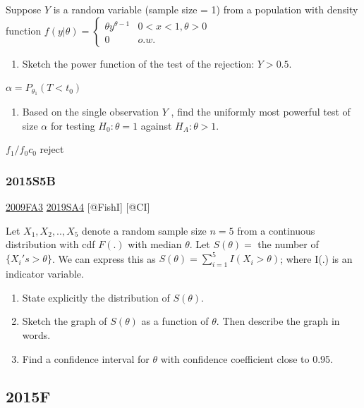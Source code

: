\documentclass[6pt,twocolumn,Portrait]{article}
\providecommand{\tightlist}{%
  \setlength{\itemsep}{0pt}\setlength{\parskip}{0pt}}
\begin{document}
Suppose \(Y\) is a random variable (sample size = 1) from a population
with density function
\(f(y|\theta)=\begin{cases}\theta y^{\theta-1}& 0<x<1,\theta>0\\0& o.w.\end{cases}\)

\begin{enumerate}
\def\labelenumi{(\alph{enumi})}
\tightlist
\item
  Sketch the power function of the test of the rejection: \(Y>0.5\).
\end{enumerate}

\(\alpha=P_{\theta_1}(T<t_0)\)

\begin{enumerate}
\def\labelenumi{(\alph{enumi})}
\setcounter{enumi}{1}
\tightlist
\item
  Based on the single observation \(Y\) , find the uniformly most
  powerful test of size \(\alpha\) for testing \(H_0:\theta=1\) against
  \(H_A :\theta>1\).
\end{enumerate}

\(f_1/f_0c_0\) reject

\hypertarget{s5b-1}{%
\subsubsection{2015S5B}\label{s5b-1}}

\protect\hyperlink{fa3}{2009FA3} \protect\hyperlink{sa4-3}{2019SA4}
{[}@FishI{]} {[}@CI{]}

Let \(X_1,X_2,..,X_{5}\) denote a random sample size \(n=5\) from a
continuous distribution with cdf \(F(.)\) with median \(\theta\). Let
\(S(\theta)=\) the number of \(\{X_i's>\theta\}\). We can express this
as \(S(\theta)=\sum_{i=1}^5I(X_i>\theta)\); where I(.) is an indicator
variable.

\begin{enumerate}
\def\labelenumi{(\alph{enumi})}
\item
  State explicitly the distribution of \(S(\theta)\).
\item
  Sketch the graph of \(S(\theta)\) as a function of \(\theta\). Then
  describe the graph in words.
\item
  Find a confidence interval for \(\theta\) with confidence coefficient
  close to 0.95.
\end{enumerate}

\hypertarget{f-10}{%
\subsection{2015F}\label{f-10}}
\end{document}
